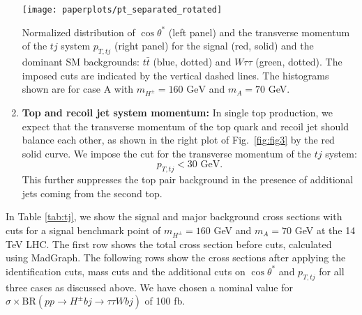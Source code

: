 \begin{enumerate}
\begin{marginfigure}
\centering
 \texttt{[image: paperplots/pt\_separated\_rotated]}
 \caption{Normalized distribution of $\cos\theta^*$ (left panel) and the transverse momentum of the $tj$ system $p_{T,tj}$ (right panel) for the signal (red, solid) and the dominant SM backgrounds: $t\bar{t}$ (blue, dotted) and $W\tau\tau$ (green, dotted). The imposed cuts are indicated by the vertical dashed lines. The histograms shown are for case A with $m_{H^{\pm}}=160\text{ GeV}$ and $m_A=70$ GeV.}
\label{fig:fig4}
\end{marginfigure}

\item\textbf{Top and recoil jet system momentum:} In single top production, we expect that the transverse momentum of the top quark and recoil jet should balance each other, as shown in the right plot of Fig.~\ref{fig:fig3} by the red solid curve. We impose the cut for the transverse momentum of the $tj$ system: 
\begin{equation}
p_{T,tj} < 30 \text{ GeV}.
\label{eqPT}
\end{equation}
This further suppresses the top pair background in the presence of additional jets coming from the second top.
 
\end{enumerate}



In Table \ref{tab:tj}, we show the signal and major background cross sections with cuts for a signal benchmark point of $m_{H^{\pm}} = 160$ GeV and $m_A = 70$ GeV at the 14 TeV LHC. The first row shows the total cross section before cuts, calculated using MadGraph. The following rows show the cross sections after applying the identification cuts, mass cuts and the additional cuts on $\cos\theta^*$ and $p_{T,tj}$ for all three cases as discussed above. We have chosen a nominal value for $\sigma \times \text{BR}( p p \rightarrow H^{\pm} b j \rightarrow \tau \tau W bj)$ of 100 fb.


